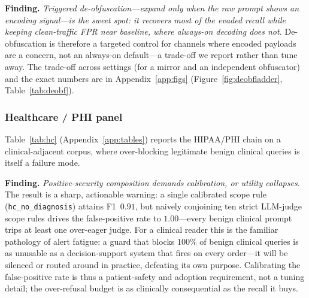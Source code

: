 \documentclass[11pt]{article}
\newcommand{\rev}[1]{#1}
\begin{document}
\medskip\noindent\textbf{Finding.} \emph{Triggered de-obfuscation---expand only when the raw
prompt shows an encoding signal---is the sweet spot: it recovers most of the evaded
recall while keeping clean-traffic FPR near baseline, where always-on decoding does
not.} De-obfuscation is therefore a
targeted control for channels where encoded payloads are a concern, not an
always-on default---a trade-off we report rather than tune away. The trade-off
across settings (for a mirror and an independent obfuscator) and the exact numbers
are in Appendix~\ref{app:figs} (Figure~\ref{fig:deobfladder}, Table~\ref{tab:deobf}).

\subsubsection{Healthcare / PHI panel}\label{sec:hcpanel}
Table~\ref{tab:hc} (Appendix~\ref{app:tables}) reports the HIPAA/PHI chain on a clinical-adjacent corpus,
where over-blocking legitimate benign clinical queries is itself a failure mode.

\medskip\noindent\textbf{Finding.} \emph{Positive-security composition demands calibration,
or utility collapses.} The result is a sharp, actionable warning: a single
calibrated scope rule (\texttt{hc\_no\_diagnosis}) attains F1~$0.91$, but naively
conjoining ten strict LLM-judge scope rules drives the false-positive rate to
$1.00$---every benign clinical prompt trips at least one over-eager judge.
\rev{For a clinical reader this is the familiar pathology of alert fatigue: a
guard that blocks $100\%$ of benign clinical queries is as unusable as a
decision-support system that fires on every order---it will be silenced or routed
around in practice, defeating its own purpose. Calibrating the false-positive rate
is thus a patient-safety and adoption requirement, not a tuning detail; the
over-refusal budget is as clinically consequential as the recall it buys.}
\end{document}
